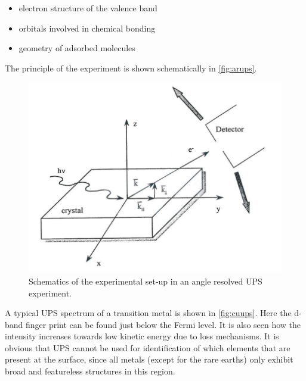 \begin{itemize}
\item electron structure of the valence band
\item orbitals involved in chemical bonding
\item geometry of adsorbed molecules
\end{itemize}

The principle of the experiment is shown schematically in \autoref{fig:arups}.

\begin{figure}[h!]
	\begin{center}
	\includegraphics[scale=4]{figures/05_01.png}
	\caption{Schematics of the experimental set-up in an angle resolved UPS experiment.}
	\label{fig:arups}
	\end{center}
\end{figure}

A typical UPS spectrum of a transition metal is shown in \autoref{fig:cuups}. Here the d-band finger print can be found just below the Fermi level. It is also seen how the intensity increases towards low kinetic energy due to loss mechanisms. It is obvious that UPS cannot be used for identification of which elements that are present at the surface, since all metals (except for the rare earths) only exhibit broad and featureless structures in this region. 

